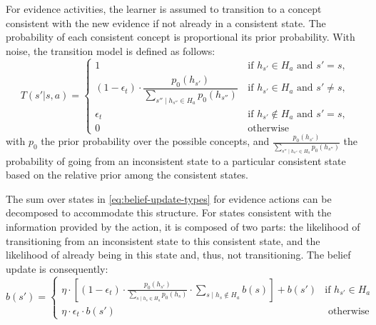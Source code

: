 For evidence activities, the learner is assumed to transition to a concept consistent with the new evidence if not already in a consistent state. The probability of each consistent concept is proportional its prior probability. 
With noise, the transition model is defined as follows:
\begin{equation}
    T(s'|s, a) = \begin{cases}
        1       & \, \text{if } h_{s'} \in H_a \text{ and } s' = s, \\ %
        (1 - \epsilon_t) \cdot \dfrac{p_0(h_{s'})}{\sum_{s'' \mid h_{s''} \in H_a} p_0(h_{s''})} & \, \text{if } h_{s'} \in H_a \text{ and } s' \neq s, \\ %
        \epsilon_t & \, \text{if }  h_{s'} \notin H_a \text{ and } s' = s, \\ %
        0 & \, \text{otherwise}
    \end{cases}
    \label{eq:trans-model}
\end{equation}
with $p_0$ the prior probability over the possible concepts,
and $\frac{p_0(h_{s'})}{\sum_{s'' \mid h_{s''} \in H_a} p_0(h_{s''})}$ the probability of going from an inconsistent state to a particular consistent state based on the relative prior among the consistent states.


The sum over states in \autoref{eq:belief-update-types} for evidence actions can be decomposed to accommodate this structure.
For states consistent with the information provided by the action, it is composed of two parts: the likelihood of transitioning from an inconsistent state to this consistent state, and the likelihood of already being in this state and, thus, not transitioning.
The belief update is consequently:
\begin{equation}
    b(s')= \begin{cases}
        \eta \cdot \left[(1 - \epsilon_t) \cdot \frac{p_0(h_{s'})}{\sum_{s \mid h_s \in H_a}{p_0(h_s)}} \cdot \sum_{s \mid h_s \notin H_a}{b(s)}\right] + b(s') & \text{if } h_{s'} \in H_a \\
        \eta \cdot \epsilon_t \cdot b(s') & \text{ otherwise }
    \end{cases}
\end{equation}

